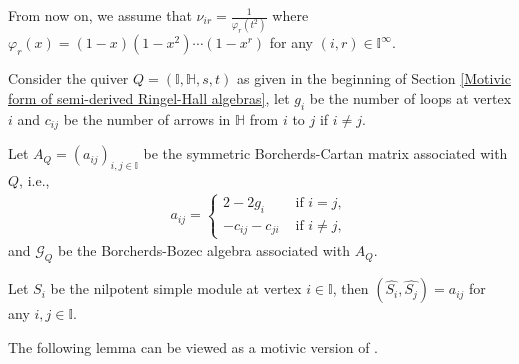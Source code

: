 \documentclass[12pt]{amsart}
\theoremstyle{definition}
\numberwithin{equation}{section}
\begin{document}
From now on, we assume that $ \nu_{ir} = \frac{1}{\varphi_r(t^2)} $ where $ \varphi_r(x) = (1-x)(1-x^2)\cdots(1-x^r)  $ for any $ (i,r) \in \mathbb{I}^{\infty} $.

Consider the quiver $ Q =(\mathbb{I},\mathbb{H},s,t) $ as given in the beginning of Section \ref{Motivic form of semi-derived Ringel-Hall algebras}, let $ g_i $ be the number of loops at vertex $ i $ and $ c_{ij} $ be the number of arrows in $ \mathbb{H} $ from $ i $ to $ j $ if $ i \neq j $. 

Let $ A_Q = (a_{ij})_{i,j \in \mathbb{I}} $ be the symmetric Borcherds-Cartan matrix associated with $ Q $, i.e., 
\begin{align*}
    a_{ij} = \begin{cases}
        2 - 2 g_i &\text{ if } i = j,\\
        -c_{ij}-c_{ji} &\text{ if } i \neq j,
    \end{cases}
\end{align*}
and $ \mathcal{G}_{Q} $ be the Borcherds-Bozec algebra associated with $ A_Q $.


Let $ S_i $ be the nilpotent simple module at vertex $ i \in \mathbb{I} $, then $ (\widehat{S_i}, \widehat{S_j}) = a_{i j} $ for any $ i,j \in \mathbb{I} $.

The following lemma can be viewed as a motivic version of \cite[Lemma 3.2]{L23}. 
\end{document}
